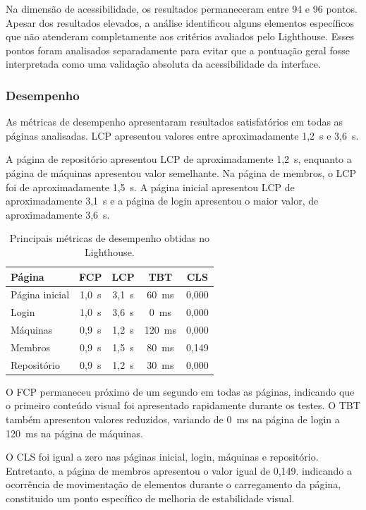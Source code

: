 Na dimensão de acessibilidade, os resultados permaneceram entre 94 e 96 pontos. Apesar dos resultados elevados, a análise identificou alguns elementos específicos que não atenderam completamente aos critérios avaliados pelo Lighthouse. Esses pontos foram analisados separadamente para evitar que a pontuação geral fosse interpretada como uma validação absoluta da acessibilidade da interface.

\subsubsection{Desempenho}

As métricas de desempenho apresentaram resultados satisfatórios em todas as páginas analisadas. LCP apresentou valores entre aproximadamente 1,2~s e 3,6~s.

A página de repositório apresentou LCP de aproximadamente 1,2~s, enquanto a página de máquinas apresentou valor semelhante. Na página de membros, o LCP foi de aproximadamente 1,5~s. A página inicial apresentou LCP de aproximadamente 3,1~s e a página de login apresentou o maior valor, de aproximadamente 3,6~s.

\begin{table}[H]
	\centering
	\caption{Principais métricas de desempenho obtidas no Lighthouse.}
	\label{tab:lighthouse-performance}
	\begin{tabular}{lcccc}
		\hline
		\textbf{Página} & \textbf{FCP} & \textbf{LCP} & \textbf{TBT} & \textbf{CLS} \\
		\hline
		Página inicial & 1,0~s & 3,1~s & 60~ms & 0,000 \\
		Login & 1,0~s & 3,6~s & 0~ms & 0,000 \\
		Máquinas & 0,9~s & 1,2~s & 120~ms & 0,000 \\
		Membros & 0,9~s & 1,5~s & 80~ms & 0,149 \\
		Repositório & 0,9~s & 1,2~s & 30~ms & 0,000 \\
		\hline
	\end{tabular}
\end{table}

O FCP permaneceu próximo de um segundo em todas as páginas, indicando que o primeiro conteúdo visual foi apresentado rapidamente durante os testes. O TBT também apresentou valores reduzidos, variando de 0~ms na página de login a 120~ms na página de máquinas.

O CLS foi igual a zero nas páginas inicial, login, máquinas e repositório. Entretanto, a página de membros apresentou o valor igual de 0,149. indicando a ocorrência de movimentação de elementos durante o carregamento da página, constituido um ponto específico de melhoria de estabilidade visual.

